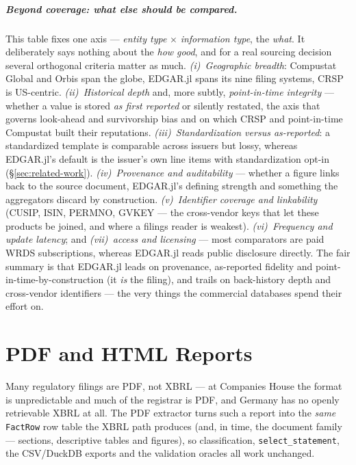 \documentclass[11pt,a4paper]{report}
\begin{document}
\paragraph{Beyond coverage: what else should be compared.} This table fixes one axis ---
\emph{entity type} $\times$ \emph{information type}, the \emph{what}. It deliberately says nothing
about the \emph{how good}, and for a real sourcing decision several orthogonal criteria matter as
much. \emph{(i)~Geographic breadth}: Compustat Global and Orbis span the globe, EDGAR.jl spans its
nine filing systems, CRSP is US-centric. \emph{(ii)~Historical depth} and, more subtly,
\emph{point-in-time integrity} --- whether a value is stored \emph{as first reported} or silently
restated, the axis that governs look-ahead and survivorship bias and on which CRSP and point-in-time
Compustat built their reputations. \emph{(iii)~Standardization versus as-reported}: a standardized
template is comparable across issuers but lossy, whereas EDGAR.jl's default is the issuer's own line
items with standardization opt-in (\S\ref{sec:related-work}). \emph{(iv)~Provenance and auditability}
--- whether a figure links back to the source document, EDGAR.jl's defining strength and something
the aggregators discard by construction. \emph{(v)~Identifier coverage and linkability} (CUSIP, ISIN,
PERMNO, GVKEY --- the cross-vendor keys that let these products be joined, and where a filings reader
is weakest). \emph{(vi)~Frequency and update latency}; and \emph{(vii)~access and licensing} --- most
comparators are paid WRDS subscriptions, whereas EDGAR.jl reads public disclosure directly. The fair
summary is that EDGAR.jl leads on provenance, as-reported fidelity and point-in-time-by-construction
(it \emph{is} the filing), and trails on back-history depth and cross-vendor identifiers --- the very
things the commercial databases spend their effort on.


\chapter{PDF and HTML Reports}
\label{ch:pdf}

Many regulatory filings are PDF, not XBRL --- at Companies House the format is unpredictable and much of
the registrar is PDF, and Germany has no openly retrievable XBRL at all. The PDF extractor turns such a
report into the \emph{same} \texttt{FactRow} row table the XBRL path produces (and, in time, the document
family --- sections, descriptive tables and figures), so classification, \texttt{select\_statement}, the
CSV/DuckDB exports and the validation oracles all work unchanged.
\end{document}
